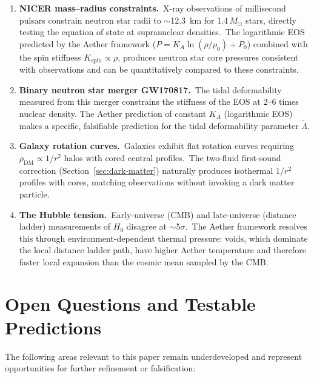 ﻿\documentclass[12pt,letterpaper]{article}
\newcommand{\Ka}{K_{\!A}}
\begin{document}
\begin{enumerate}[leftmargin=2em]
  \item \textbf{NICER mass--radius constraints.}\ X-ray observations of
    millisecond pulsars \cite{miller2021,riley2021} constrain neutron star
    radii to $\sim$12.3~km for 1.4\,$M_\odot$ stars, directly testing the
    equation of state at supranuclear densities.\ The logarithmic EOS
    predicted by the Aether framework ($P = \Ka \ln(\rho/\rho_0) + P_0$)
    combined with the spin stiffness $K_{\mathrm{spin}} \propto \rho$,
    produces neutron star core pressures consistent with observations
    and can be quantitatively compared to these constraints.

  \item \textbf{Binary neutron star merger GW170817.}\ The tidal
    deformability measured from this merger \cite{ligo2017gw170817}
    constrains the stiffness of the EOS at 2--6 times nuclear density.
    The Aether prediction of constant $\Ka$ (logarithmic EOS) makes a
    specific, falsifiable prediction for the tidal deformability parameter
    $\tilde{\Lambda}$.

  \item \textbf{Galaxy rotation curves.}\ Galaxies exhibit flat rotation
    curves requiring $\rho_{\mathrm{DM}} \propto 1/r^2$ halos with cored
    central profiles.\ The two-fluid first-sound correction
    (Section~\ref{sec:dark-matter}) naturally produces isothermal
    $1/r^2$ profiles with cores, matching observations without invoking
    a dark matter particle.

  \item \textbf{The Hubble tension.}\ Early-universe (CMB) and
    late-universe (distance ladder) measurements of $H_0$ disagree at
    $\sim$5$\sigma$.\ The Aether framework resolves this through
    environment-dependent thermal pressure: voids, which dominate the
    local distance ladder path, have higher Aether temperature and
    therefore faster local expansion than the cosmic mean sampled by
    the CMB.

\end{enumerate}


\section{Open Questions and Testable Predictions}

The following areas relevant to this paper remain underdeveloped and represent opportunities for further refinement or falsification:
\end{document}
